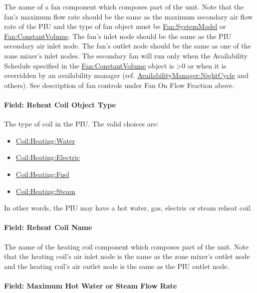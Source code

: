 The name of a fan component which composes part of the unit. Note that the fan's maximum flow rate should be the same as the maximum secondary air flow rate of the PIU and the type of fan object must be \hyperref[fansystemmodel]{Fan:SystemModel} or \hyperref[fanconstantvolume]{Fan:ConstantVolume}. The fan's inlet node should be the same as the PIU secondary air inlet node. The fan's outlet node should be the same as one of the zone mixer's inlet nodes. The secondary fan will run only when the Availability Schedule specified in the \hyperref[fanconstantvolume]{Fan:ConstantVolume} object is >0 or when it is overridden by an availability manager (ref. \hyperref[availabilitymanagernightcycle]{AvailabilityManager:NightCycle} and others). See description of fan controls under Fan On Flow Fraction above.

\paragraph{Field: Reheat Coil Object Type}\label{field-reheat-coil-object-type-4}

The type of coil in the PIU. The valid choices are:

\begin{itemize}
\item
  \hyperref[coilheatingwater]{Coil:Heating:Water}
\item
  \hyperref[coilheatingelectric]{Coil:Heating:Electric}
\item
  \hyperref[coilheatinggas-000]{Coil:Heating:Fuel}
\item
  \hyperref[coilheatingsteam]{Coil:Heating:Steam}
\end{itemize}

In other words, the PIU may have a hot water, gas, electric or steam reheat coil.

\paragraph{Field: Reheat Coil Name}\label{field-reheat-coil-name-4}

The name of the heating coil component which composes part of the unit. Note that the heating coil's air inlet node is the same as the zone mixer's outlet node and the heating coil's air outlet node is the same as the PIU outlet node.

\paragraph{Field: Maximum Hot Water or Steam Flow Rate}\label{field-maximum-hot-water-or-steam-flow-rate-5}


